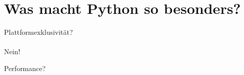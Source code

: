 \documentclass{beamer}
\begin{document}
{
  \begin{frame}[plain]
  \end{frame}
}

\section{Was macht Python so besonders?}

\begin{frame}
\begin{center}
{ \Huge Plattformexklusivität?}\\~\\
\pause
Nein!
\end{center}
\end{frame}

\begin{frame}
\begin{center}
{ \Huge Performance?}
\end{center}
\end{frame}

{
  \begin{frame}[plain]
  \end{frame}
}
\end{document}
